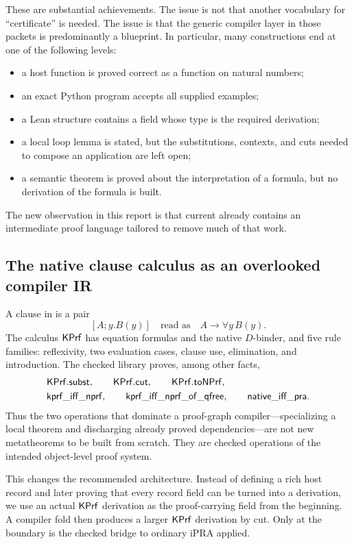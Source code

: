 These are substantial achievements.  The issue is not that another vocabulary
for ``certificate'' is needed.  The issue is that the generic compiler layer in
those packets is predominantly a blueprint.  In particular, many constructions
end at one of the following levels:

\begin{itemize}
\item a host function is proved correct as a function on natural numbers;
\item an exact Python program accepts all supplied examples;
\item a Lean structure contains a field whose type is the required derivation;
\item a local loop lemma is stated, but the substitutions, contexts, and cuts
needed to compose an application are left open;
\item a semantic theorem is proved about the interpretation of a formula, but
no derivation of the formula is built.
\end{itemize}

The new observation in this report is that current  already
contains an intermediate proof language tailored to remove much of that work.

\subsection{The native clause calculus as an overlooked compiler IR}

A clause in  is a pair
\[
  [A;y.B(y)] \quad\text{read as}\quad A\to\forall y\,B(y).
\]
The calculus \(\mathsf{KPrf}\) has equation formulas and the native \(D\)-binder, and
five rule families: reflexivity, two evaluation cases, clause use, elimination,
and introduction.  The checked library proves, among other facts,
\[
\begin{aligned}
&\mathsf{KPrf}.\mathsf{subst},\qquad
  \mathsf{KPrf}.\mathsf{cut},\qquad
  \mathsf{KPrf}.\mathsf{toNPrf},\\
&\mathsf{kprf\_iff\_nprf},\qquad
  \mathsf{kprf\_iff\_nprf\_of\_qfree},\qquad
  \mathsf{native\_iff\_pra}.
\end{aligned}
\]
Thus the two operations that dominate a proof-graph compiler---specializing a
local theorem and discharging already proved dependencies---are not new
metatheorems to be built from scratch.  They are checked operations of the
intended object-level proof system.

This changes the recommended architecture.  Instead of defining a rich host
record  and later proving that every record field can be turned
into a derivation, we use an actual \(\mathsf{KPrf}\) derivation as the proof-carrying
field from the beginning.  A compiler fold then produces a larger \(\mathsf{KPrf}\)
derivation by cut.  Only at the boundary is the checked bridge to ordinary iPRA
applied.

